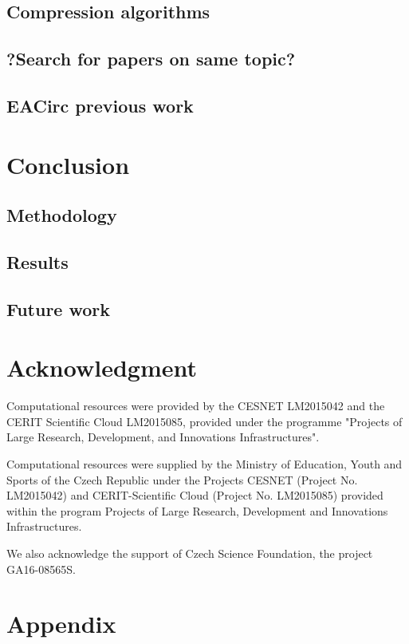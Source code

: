 \documentclass[
  print, %
  Table,   %
  nolof,     %
  nolot,     %
  11pt, %
  oneside  %
]{fithesis3}
\begin{document}
\section{Compression algorithms}
\label{sec:relatwork-compress}

\section{?Search for papers on same topic?}
\label{sec:relatwork-paper}

\section{EACirc previous work}
\label{sec:relatwork-eac}

\chapter{Conclusion}
\label{chap:conclusion}

\section{Methodology}
\label{sec:conclusion-method}
\section{Results}
\label{sec:conclusion-results}
\section{Future work}
\label{sec:conclusion-future}

\chapter*{Acknowledgment}
\label{chap:ack}

Computational resources were provided by the CESNET LM2015042 and the CERIT Scientific Cloud LM2015085, provided under the programme "Projects of Large Research, Development, and Innovations Infrastructures".

Computational resources were supplied by the Ministry of Education, Youth and Sports of the Czech Republic under the Projects CESNET (Project No. LM2015042) and CERIT-Scientific Cloud (Project No. LM2015085) provided within the program Projects of Large Research, Development and Innovations Infrastructures.

We also acknowledge the support of Czech Science Foundation, the project GA16-08565S.


\chapter*{Appendix}
\label{chap:app}
\end{document}
